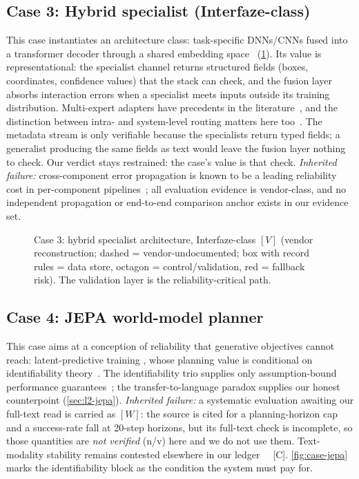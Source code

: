 \subsection{Case 3: Hybrid specialist (Interfaze-class)}
\label{sec:case-hybrid}
This case instantiates an architecture class: task-specific DNNs/CNNs fused into a transformer
decoder through a shared embedding space~\cite{interfaze2026} (\cref{fig:case-hybrid}). Its
value is representational: the specialist channel returns structured fields (boxes,
coordinates, confidence values) that the stack can check, and the fusion layer absorbs
interaction errors when a specialist meets inputs outside its training distribution.
Multi-expert adapters have precedents in the literature~\cite{id230317580,id240509818}, and the
distinction between intra- and system-level routing matters here too~\cite{id240706204}. The
metadata stream is only verifiable because the specialists return typed fields; a generalist
producing the same fields as text would leave the fusion layer nothing to check. Our verdict
stays restrained: the case's value is that check. \emph{Inherited failure:} cross-component
error propagation is known to be a leading reliability cost in per-component
pipelines~\cite{mdpi2026arlm}; all evaluation evidence is vendor-class, and no independent
propagation or end-to-end comparison anchor exists in our evidence set.

\begin{figure}[h!]
  \centering
  \resizebox{\linewidth}{!}{}
  \caption{Case 3: hybrid specialist architecture, Interfaze-class $[V]$ (vendor reconstruction; dashed = vendor-undocumented; box with record rules = data store, octagon = control/validation, red = fallback risk). The validation layer is the reliability-critical path.}
  \label{fig:case-hybrid}
\end{figure}

\subsection{Case 4: JEPA world-model planner}
\label{sec:case-jepa}
This case aims at a conception of reliability that generative objectives cannot reach:
latent-predictive training \cite{id230108243}, whose planning value is conditional on
identifiability theory~\cite{klindt2026lejepa,identifiability2026,id260612471}. The
identifiability trio supplies only assumption-bound performance
guarantees~\cite{klindt2026lejepa,identifiability2026}; the transfer-to-language paradox
supplies our honest counterpoint (\cref{sec:l2-jepa}). \emph{Inherited failure:} a systematic
evaluation awaiting our full-text read is carried as $[W]$: the source is cited for a
planning-horizon cap and a success-rate fall at 20-step horizons, but its full-text check is
incomplete, so those quantities are \emph{not verified} (n/v) here and we do not use them.
Text-modality stability remains contested elsewhere in our ledger~\cite{id260723531}
\evindep{}~\textsf{[C]}.
\cref{fig:case-jepa} marks the
identifiability block as the condition the system must pay for.

